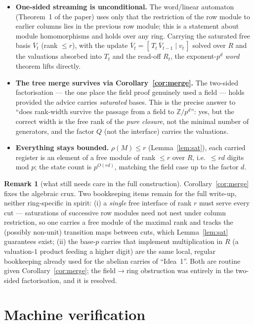 \documentclass[11pt,a4paper]{article}
\theoremstyle{plain}
\theoremstyle{definition}
\newtheorem{remark}[lemma]{Remark}
\newcommand{\Zp}{\mathbb{Z}}
\newcommand{\R}{R}
\newcommand{\sat}[1]{\overline{#1}}
\begin{document}
\begin{itemize}
\item \textbf{One-sided streaming is unconditional.} The word/linear
  automaton (Theorem~1 of the paper) uses only that the restriction of the
  row module to earlier columns lies in the previous row module; this is a
  statement about module homomorphisms and holds over any ring. Carrying
  the saturated free basis $\sat V_t$ (rank $\le r$), with the update
  $\sat V_t=[\,T_t\,\sat V_{t-1}\mid v_t\,]$ solved over $\R$ and the
  valuations absorbed into $T_t$ and the read-off $R_t$, the exponent-$p^d$
  \emph{word} theorem lifts directly.
\item \textbf{The tree merge survives via Corollary~\ref{cor:merge}.} The
  two-sided factorisation --- the one place the field proof genuinely used
  a field --- holds provided the advice carries \emph{saturated} bases.
  This is the precise answer to ``does rank-width survive the passage from
  a field to $\Zp/p^{d}$'': yes, but the correct width is the free rank of
  the \emph{pure closure}, not the minimal number of generators, and the
  factor $Q$ (not the interface) carries the valuations.
\item \textbf{Everything stays bounded.} $\rho(M)\le r$
  (Lemma~\ref{lem:sat}), each carried register is an element of a free
  module of rank $\le r$ over $\R$, i.e.\ $\le rd$ digits mod $p$; the
  state count is $p^{O(rd)}$, matching the field case up to the factor $d$.
\end{itemize}

\begin{remark}[what still needs care in the full construction]
Corollary~\ref{cor:merge} fixes the algebraic crux. Two bookkeeping items
remain for the full write-up, neither ring-specific in spirit:
(i) a \emph{single} free interface of rank $r$ must serve every cut ---
saturations of successive row modules need not nest under column
restriction, so one carries a free module of the maximal rank and tracks
the (possibly non-unit) transition maps between cuts, which
Lemma~\ref{lem:sat} guarantees exist; (ii) the base-$p$ carries that
implement multiplication in $\R$ (a valuation-$1$ product feeding a higher
digit) are the same local, regular bookkeeping already used for the
abelian carries of ``Idea~1''. Both are routine given
Corollary~\ref{cor:merge}; the field$\to$ring obstruction was entirely in
the two-sided factorisation, and it is resolved.
\end{remark}

\section{Machine verification}\label{sec:machine}
\end{document}

